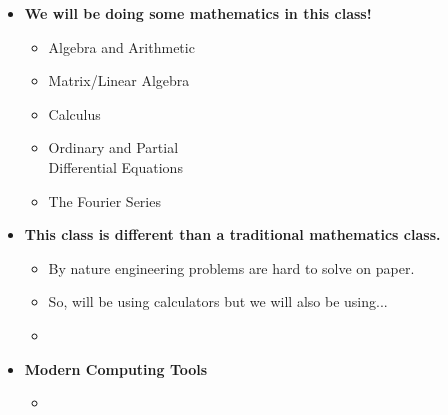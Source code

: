 \documentclass[11pt]{article}
\begin{document}
\begin{itemize}
\begin{itemize}
		\end{itemize}
		\newpage
		
		\item \textbf{ \LARGE We will be doing some mathematics in this class!}\\
		\begin{multicols}{2}
		\begin{itemize}
		
			\item Algebra and Arithmetic\\
			\item Matrix\slash Linear Algebra \\
			\item Calculus \\
			\item Ordinary and Partial \\Differential Equations \\
			\item The Fourier Series \\
			
		
		\end{itemize}
		\end{multicols}
				
		\item \textbf{ \LARGE This class is different than a traditional mathematics class.}\\ 
				\begin{itemize}
					\item By nature engineering problems are hard to solve on paper.\\
					
					\item So, will be using calculators but we will also be using...\\
									
					\item \hspace{1mm} \vspace{10mm}\\
									
				\end{itemize}
				
		\item \textbf{ \LARGE Modern Computing Tools}\\ 		
		
				\begin{itemize}
					\item  \hspace{1mm} \vspace{5mm}\\
					

\end{itemize}
\end{itemize}
\end{document}
